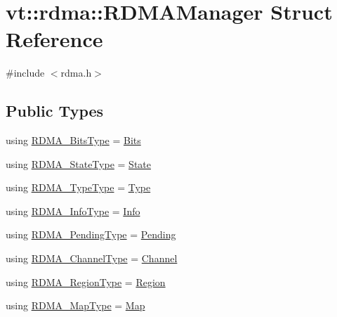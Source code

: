 \hypertarget{structvt_1_1rdma_1_1_r_d_m_a_manager}{}\section{vt\+:\+:rdma\+:\+:R\+D\+M\+A\+Manager Struct Reference}
\label{structvt_1_1rdma_1_1_r_d_m_a_manager}


{\ttfamily \#include $<$rdma.\+h$>$}

\subsection*{Public Types}
\begin{DoxyCompactItemize}
\item 
using \hyperlink{structvt_1_1rdma_1_1_r_d_m_a_manager_a1fd134fc514587ac616aec8530c7cc87}{R\+D\+M\+A\+\_\+\+Bits\+Type} = \hyperlink{namespacevt_1_1rdma_a91e7211515508952960ca446ea609f65}{Bits}
\item 
using \hyperlink{structvt_1_1rdma_1_1_r_d_m_a_manager_aad42879902ea82c4de357ad482d9333d}{R\+D\+M\+A\+\_\+\+State\+Type} = \hyperlink{structvt_1_1rdma_1_1_state}{State}
\item 
using \hyperlink{structvt_1_1rdma_1_1_r_d_m_a_manager_a7f4369a60dfe2ca11abe39a4ce8c2f5e}{R\+D\+M\+A\+\_\+\+Type\+Type} = \hyperlink{namespacevt_1_1rdma_ac848e1d9da43db6294bd06f83e5d3946}{Type}
\item 
using \hyperlink{structvt_1_1rdma_1_1_r_d_m_a_manager_a81658757dd2c692d5c31048d2d53cb3d}{R\+D\+M\+A\+\_\+\+Info\+Type} = \hyperlink{structvt_1_1rdma_1_1_info}{Info}
\item 
using \hyperlink{structvt_1_1rdma_1_1_r_d_m_a_manager_a1239149a2070897c56e94e65c2016a7a}{R\+D\+M\+A\+\_\+\+Pending\+Type} = \hyperlink{structvt_1_1rdma_1_1_pending}{Pending}
\item 
using \hyperlink{structvt_1_1rdma_1_1_r_d_m_a_manager_ad6a7e417dca07fe5743318e1153677a8}{R\+D\+M\+A\+\_\+\+Channel\+Type} = \hyperlink{structvt_1_1rdma_1_1_channel}{Channel}
\item 
using \hyperlink{structvt_1_1rdma_1_1_r_d_m_a_manager_aafc574f533ebf5b34c1389ef504448bf}{R\+D\+M\+A\+\_\+\+Region\+Type} = \hyperlink{structvt_1_1rdma_1_1_region}{Region}
\item 
using \hyperlink{structvt_1_1rdma_1_1_r_d_m_a_manager_a16e12d11cf7d771df0d3dc6947a4f95c}{R\+D\+M\+A\+\_\+\+Map\+Type} = \hyperlink{structvt_1_1rdma_1_1_map}{Map}
\item 

\end{DoxyCompactItemize}
